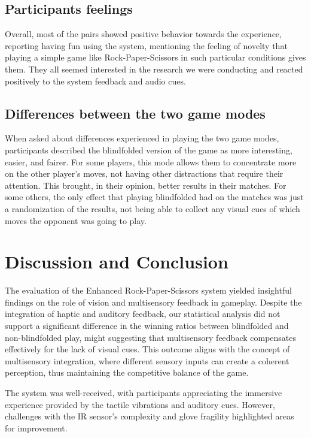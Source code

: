 \documentclass[11pt,a4paper]{report}
\begin{document}
\subsection*{Participants feelings}
Overall, most of the pairs showed positive behavior towards the experience, reporting having fun using the system, mentioning the feeling of novelty that playing a simple game like Rock-Paper-Scissors in such particular conditions gives them. They all seemed interested in the research we were conducting and reacted positively to the system feedback and audio cues.

\subsection*{Differences between the two game modes}
When asked about differences experienced in playing the two game modes, participants described the blindfolded version of the game as more interesting, easier, and fairer. For some players, this mode allows them to concentrate more on the other player's moves, not having other distractions that require their attention. This brought, in their opinion, better results in their matches. For some others, the only effect that playing blindfolded had on the matches was just a randomization of the results, not being able to collect any visual cues of which moves the opponent was going to play.

\section*{Discussion and Conclusion}
The evaluation of the Enhanced Rock-Paper-Scissors system yielded insightful findings on the role of vision and multisensory feedback in gameplay. Despite the integration of haptic and auditory feedback, our statistical analysis did not support a significant difference in the winning ratios between blindfolded and non-blindfolded play, might suggesting that multisensory feedback compensates effectively for the lack of visual cues. This outcome aligns with the concept of multisensory integration, where different sensory inputs can create a coherent perception, thus maintaining the competitive balance of the game.

\noindent The system was well-received, with participants appreciating the immersive experience provided by the tactile vibrations and auditory cues. However, challenges with the IR sensor's complexity and glove fragility highlighted areas for improvement. 
\end{document}
